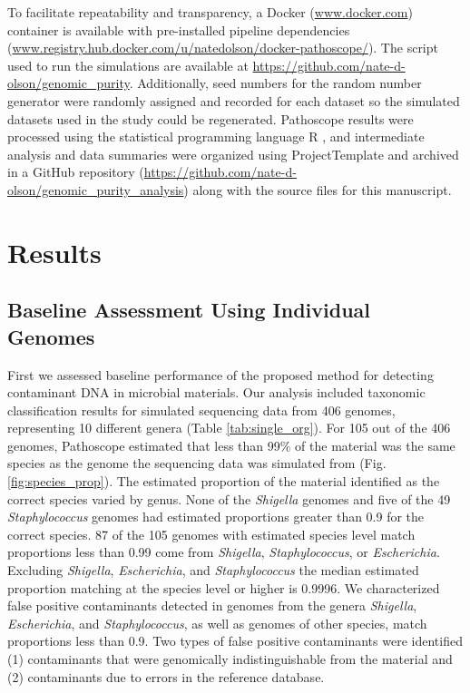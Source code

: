 \documentclass[fleqn,10pt,lineno]{wlpeerj}\usepackage[]{graphicx}\usepackage[]{color}
\begin{document}

To facilitate repeatability and transparency, a Docker (\url{www.docker.com}) container is available 
with pre-installed pipeline dependencies (\url{www.registry.hub.docker.com/u/natedolson/docker-pathoscope/}). 
The script used to run the simulations are available at \url{https://github.com/nate-d-olson/genomic_purity}.
Additionally, seed numbers for the random number generator were randomly assigned and recorded for each dataset so the simulated datasets used in the study could be regenerated.
Pathoscope results were processed using the statistical programming language R \citep{R}, and intermediate analysis and data summaries were organized using ProjectTemplate \citep{ProjectTemplate} and archived in a GitHub repository (\url{https://github.com/nate-d-olson/genomic_purity_analysis}) along with the source files for this manuscript.

\section*{Results}

\subsection*{Baseline Assessment Using Individual Genomes}


First we assessed baseline performance of the proposed method for detecting contaminant DNA in microbial materials. 
Our analysis included taxonomic classification results for simulated sequencing data  from 406 genomes, representing 10 different genera (Table \ref{tab:single_org}). 
For 105 out of the 406 genomes, Pathoscope estimated that less than 99\% of the material was the same species as the genome the sequencing data was simulated from (Fig. \ref{fig:species_prop}). 
The estimated proportion of the material identified as the correct species varied by genus. 
None of the \textit{Shigella} genomes and five of the 49 \textit{Staphylococcus} genomes had estimated proportions greater than 0.9 for the correct species. 
87 of the 105 genomes with estimated species level match proportions less than 0.99 come from \textit{Shigella}, \textit{Staphylococcus}, or \textit{Escherichia}. 
Excluding \textit{Shigella}, \textit{Escherichia}, and \textit{Staphylococcus} the median estimated proportion matching at the species level or higher is  0.9996. 
We characterized false positive contaminants detected in genomes from the genera \textit{Shigella}, \textit{Escherichia}, and \textit{Staphylococcus}, as well as genomes of other species, match proportions less than 0.9. 
Two types of false positive contaminants were identified (1) contaminants that were genomically indistinguishable from the material and (2) contaminants due to errors in the reference database.
\end{document}
